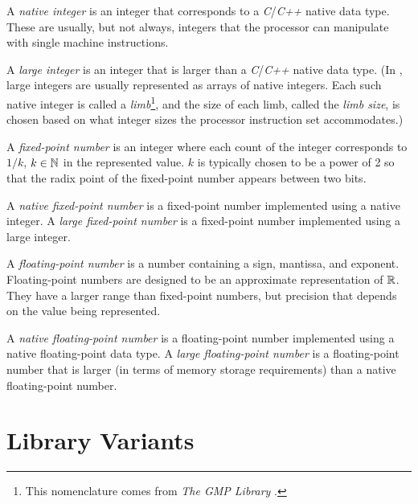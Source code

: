A \emph{native integer} is an integer 
that corresponds to a \emph{C}/\emph{C++} native data type.  
These are usually, but not always, integers that the 
processor can manipulate with single machine instructions.  

A \emph{large integer} is an integer 
that is larger than a \emph{C}/\emph{C++} native data type.  
(In \emph{\productbasenameshort{}}, large integers are 
usually represented as arrays of native integers.  Each such 
native integer is called a \emph{limb}\footnote{This nomenclature comes 
from \emph{The GMP Library} 
\cite{bibref:w:gmplibhomepage}.}, and the size of each limb, 
called the \emph{limb size}, is chosen 
based on what integer sizes the processor instruction set 
accommodates.) 

A \emph{fixed-point number} is an 
integer where each count of the integer corresponds to 
$1/k$, $k \in {\mathbb{N}}$ in the represented value.  
$k$ is typically chosen to be a power of 2 so that the radix 
point of the fixed-point number appears between two bits.  

A \emph{native fixed-point number} is a fixed-point number 
implemented using a native integer.  A \emph{large 
fixed-point number} is a fixed-point number implemented 
using a large integer.  

A \emph{floating-point number} 
is a number containing a sign, mantissa, and exponent.  
Floating-point numbers are designed to be an approximate 
representation of ${\mathbb{R}}$.  They have a larger range 
than fixed-point numbers, but precision that depends on the 
value being represented.  

A \emph{native floating-point number} is a floating-point 
number implemented using a native floating-point data type.  
A \emph{large floating-point number} is a floating-point 
number that is larger (in terms of memory storage 
requirements) than a native floating-point number.  


\section{Library Variants}
\label{cldd0:sscc0}

